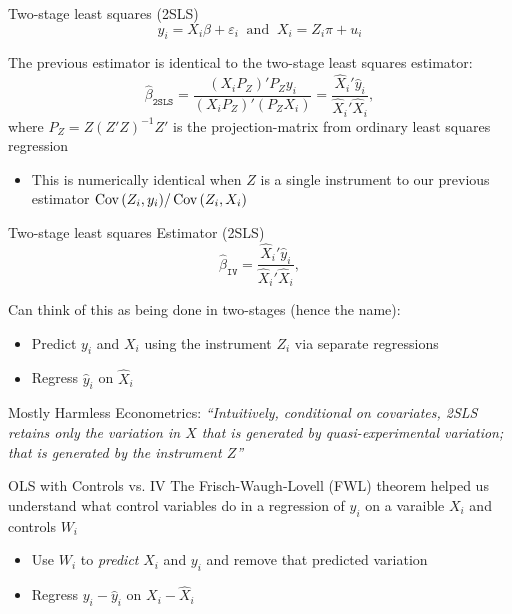 \documentclass[aspectratio=169,t,11pt,table]{beamer}
\begin{document}
\begin{frame}{Two-stage least squares (2SLS)}
  \vspace{-\bigskipamount}
  $$
    y_i = X_i \beta + \varepsilon_i \ \text{ and }\  X_i = Z_i \pi  + u_i
  $$

  The previous estimator is identical to the two-stage least squares estimator:
  $$
    \hat{\beta}_{\texttt{2SLS}} = \frac{ (X_i P_Z)' P_Z y_i }{ (X_i P_Z)' (P_Z X_i) } = \frac{\hat{X}_i' \hat{y}_i}{\hat{X}_i' \hat{X}_i},
  $$
  where $P_Z = Z (Z'Z)^{-1} Z'$ is the projection-matrix from ordinary least squares regression
  
  \pause
  \begin{itemize}
    \item This is numerically identical when $Z$ is a single instrument to our previous estimator $\cov{Z_i, y_i} / \cov{Z_i, X_i}$
  \end{itemize}
\end{frame}

\begin{frame}{Two-stage least squares Estimator (2SLS)}
  \vspace*{-\bigskipamount}
  $$
    \hat{\beta}_{\texttt{IV}} = \frac{\hat{X}_i' \hat{y}_i}{\hat{X}_i' \hat{X}_i},
  $$

  \bigskip
  Can think of this as being done in two-stages (hence the name):
  \begin{itemize}
    \item Predict $y_i$ and $X_i$ using the instrument $Z_i$ via separate regressions 
    \item Regress $\hat{y}_i$ on $\hat{X}_i$
  \end{itemize}

  \pause
  \bigskip
  Mostly Harmless Econometrics: \emph{``Intuitively, conditional on covariates, 2SLS retains only the variation in $X$ that is generated by quasi-experimental variation; that is generated by the instrument $Z$''}
\end{frame}

\begin{frame}{OLS with Controls vs. IV}
  The Frisch-Waugh-Lovell (FWL) theorem helped us understand what control variables do in a regression of $y_i$ on a varaible $X_i$ and controls $W_i$
  \begin{itemize}
    \item Use $W_i$ to \emph{predict} $X_i$ and $y_i$ and remove that predicted variation
    
    \item Regress $y_i - \hat{y}_i$ on $X_i - \hat{X}_i$
  \end{itemize}
\end{frame}
\end{document}
